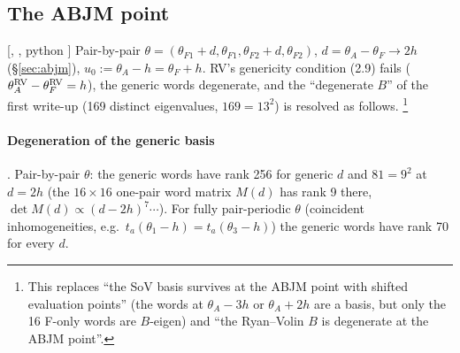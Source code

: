 \subsection{The ABJM point}\label{sec:sov-abjm}

[, , python ] Pair-by-pair $\theta=(\theta_{F1}+d,\theta_{F1},\theta_{F2}+d,\theta_{F2})$, $d=\theta_A-\theta_F\to2h$
(\S\ref{sec:abjm}), $u_0:=\theta_A-h=\theta_F+h$. RV's genericity condition (2.9) fails ($\theta^{\rm RV}_A-\theta^{\rm RV}_F=h$), the generic words degenerate, and the ``degenerate $B$'' of the
first write-up (169 distinct eigenvalues, $169=13^2$) is resolved as follows.%
\footnote{This replaces ``the SoV basis survives at the ABJM point with shifted evaluation points'' (the words at $\theta_A-3h$ or $\theta_A+2h$ are a basis, but only the 16 F-only words are $B$-eigen)
and ``the Ryan--Volin $B$ is degenerate at the ABJM point''.}

\paragraph{Degeneration of the generic basis} \ex. Pair-by-pair $\theta$: the generic words have rank 256 for generic $d$ and $81=9^2$ at $d=2h$ (the $16\times16$ one-pair word matrix $M(d)$ has rank 9 there, $\det M(d)\propto(d-2h)^7\cdots$). For fully pair-periodic $\theta$ (coincident inhomogeneities, e.g.\ $t_a(\theta_1-h)=t_a(\theta_3-h)$) the generic words
have rank 70 for every $d$.

